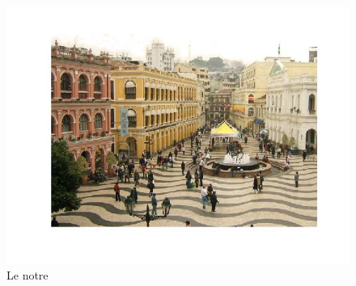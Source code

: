 \documentclass{article}
\begin{document}
\begin{figure}[h]
\begin{minipage}{0.33\textwidth}
\includegraphics[width=1\textwidth]{images/macau_conc_tmr.jpg}
\caption{Le notre}
\end{minipage}
\end{figure}
\end{document}
